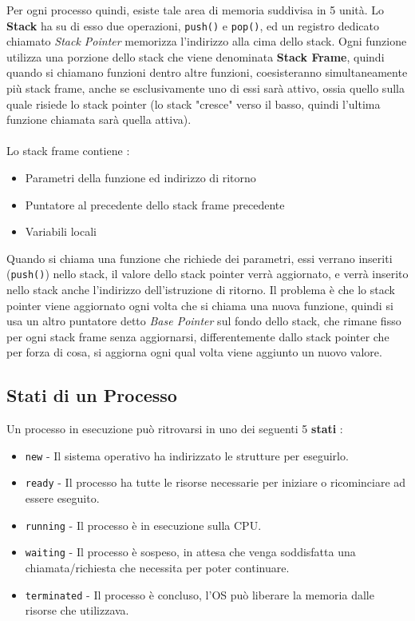 \documentclass[12pt, letterpaper]{article}
\newcommand{\code}[1]{\colorbox{light-gray}{\texttt{#1}}}
\begin{document}
Per ogni processo quindi, esiste tale area di memoria suddivisa in 5 unità. Lo \textbf{Stack} ha su di esso due 
operazioni, \code{push()} e \code{pop()}, ed un registro dedicato chiamato \textit{Stack Pointer} memorizza 
l'indirizzo alla cima dello stack. Ogni funzione utilizza una porzione dello stack che viene denominata 
\textbf{Stack Frame}, quindi quando si chiamano funzioni dentro altre funzioni, coesisteranno simultaneamente 
più stack frame, anche se esclusivamente uno di essi sarà attivo, ossia quello sulla quale risiede lo 
stack pointer (lo stack "cresce" verso il basso, quindi l'ultima funzione chiamata sarà quella attiva). 
\\\hphantom{.}\\ Lo stack frame contiene :\begin{itemize}
    \item Parametri della funzione ed indirizzo di ritorno
    \item Puntatore al precedente dello stack frame precedente
    \item Variabili locali
\end{itemize}
Quando si chiama una funzione che richiede dei parametri,
essi verrano inseriti (\code{push()}) nello stack, il valore dello stack pointer verrà aggiornato, e verrà inserito nello 
stack anche l'indirizzo dell'istruzione di ritorno. Il problema è che lo stack pointer viene aggiornato ogni 
volta che si chiama una nuova funzione, quindi si usa un altro puntatore detto \textit{Base Pointer} sul fondo 
dello stack, che rimane fisso per ogni stack frame senza aggiornarsi, differentemente dallo stack pointer che per 
forza di cosa, si aggiorna ogni qual volta viene aggiunto un nuovo valore.\newpage \subsection{Stati di un Processo}
Un processo in esecuzione può ritrovarsi in uno dei seguenti 5 \textbf{stati} : \begin{itemize}
    \item \code{new} - Il sistema operativo ha indirizzato le strutture per eseguirlo.
    \item \code{ready} - Il processo ha tutte le risorse necessarie per iniziare o ricominciare ad essere eseguito.
    \item \code{running} - Il processo è in esecuzione sulla CPU.
    \item \code{waiting} - Il processo è sospeso, in attesa che venga soddisfatta una chiamata/richiesta che necessita per poter continuare.
    \item \code{terminated} - Il processo è concluso, l'OS può liberare la memoria dalle risorse che utilizzava.
\end{itemize}
\begin{figure}[h]
\end{figure}
\end{document}
